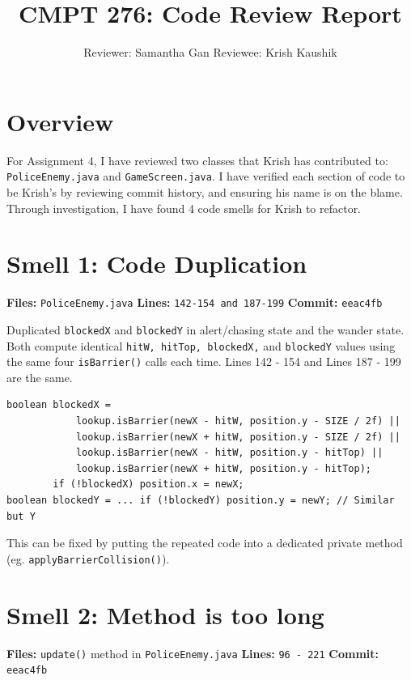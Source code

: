 \documentclass[10pt]{article}
\title{\vspace{-1cm}\textbf{CMPT 276: Code Review Report}\vspace{-0.5cm}}
\author{Reviewer: Samantha Gan \quad Reviewee: Krish Kaushik}
\date{}
\begin{document}
\maketitle
\vspace{-1cm}

\section*{Overview}

For Assignment 4, I have reviewed two classes that Krish has contributed to: \texttt{PoliceEnemy.java} and \texttt{GameScreen.java}. I have verified each section of code to be Krish's by reviewing commit history, and ensuring his name is on the blame. Through investigation, I have found 4 code smells for Krish to refactor.


\section*{Smell 1: Code Duplication}

\textbf{Files:} \texttt{PoliceEnemy.java} \quad
\textbf{Lines:} \texttt{142-154 and 187-199} \quad
\textbf{Commit:} \texttt{eeac4fb}

Duplicated \texttt{blockedX} and \texttt{blockedY} in alert/chasing state and the wander state. Both compute identical \texttt{hitW, hitTop, blockedX,} and \texttt{blockedY} values using the same four \texttt{isBarrier()} calls each time. 
Lines 142 - 154 and Lines 187 - 199 are the same.

\begin{lstlisting}
boolean blockedX =
            lookup.isBarrier(newX - hitW, position.y - SIZE / 2f) ||
            lookup.isBarrier(newX + hitW, position.y - SIZE / 2f) ||
            lookup.isBarrier(newX - hitW, position.y - hitTop) ||
            lookup.isBarrier(newX + hitW, position.y - hitTop);
        if (!blockedX) position.x = newX;
boolean blockedY = ... if (!blockedY) position.y = newY; // Similar but Y
\end{lstlisting}

This can be fixed by putting the repeated code into a dedicated private method (eg. \texttt{applyBarrierCollision()}).

\section*{Smell 2: Method is too long}

\textbf{Files:} \texttt{update()} method in \texttt{PoliceEnemy.java} \quad
\textbf{Lines:} \texttt{96 - 221} \quad
\textbf{Commit:} \texttt{eeac4fb}
\end{document}
